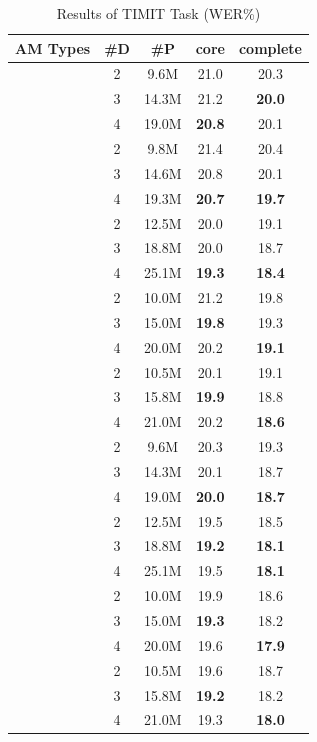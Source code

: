 \documentclass[a4paper]{article}
\begin{document}
\begin{table}
\caption{Results of TIMIT Task (WER\%)}
\centering
\begin{tabular}{c|c|c|c|c}
\hline%
\textbf{AM Types} & \textbf{\#D} & \textbf{\#P} & \textbf{core} & \textbf{complete} \\ \hline\hline
\multirow{3}{2.4cm}{\centering{LSTM}} & 2 & 9.6M& 21.0&20.3 \\ %
& 3 & 14.3M&21.2 &\textbf{20.0} \\ %
& 4 & 19.0M&\textbf{20.8} &20.1 \\ \hline
\multirow{3}{2.4cm}{\centering{Residual LSTM \cite{residual-lstm}}} & 2 &9.8M &21.4 &20.4 \\
& 3 &14.6M &20.8 &20.1 \\ %
& 4 &19.3M &\textbf{20.7} &\textbf{19.7} \\ \hline
\multirow{3}{2.4cm}{\centering{LSTM Res-1}} & 2 &12.5M &20.0 &19.1 \\ %
& 3 & 18.8M& 20.0&18.7 \\ %
& 4 & 25.1M& \textbf{19.3}&\textbf{18.4} \\ \hline
\multirow{3}{2.4cm}{\centering{LSTM Res-2}} & 2 &10.0M &21.2 &19.8 \\ %
& 3 &15.0M &\textbf{19.8} &19.3 \\ %
& 4 &20.0M &20.2 &\textbf{19.1} \\ \hline
\multirow{3}{2.4cm}{\centering{LSTM Res-3}} & 2 &10.5M &20.1 &19.1 \\ %
& 3 &15.8M &\textbf{19.9} &18.8 \\ %
& 4 &21.0M &20.2 &\textbf{18.6} \\ \hline
\multirow{3}{2.4cm}{\centering{Fast LSTM}} & 2 &9.6M &20.3 &19.3 \\ %
& 3 &14.3M &20.1 &18.7 \\ %
& 4 &19.0M &\textbf{20.0} &\textbf{18.7} \\ \hline
\multirow{3}{2.4cm}{\centering{Fast LSTM Res-1}} & 2 & 12.5M&19.5 &18.5 \\ %
& 3 &18.8M &\textbf{19.2} &\textbf{18.1} \\ %
& 4 &25.1M &19.5 &\textbf{18.1} \\ \hline
\multirow{3}{2.4cm}{\centering{Fast LSTM Res-2}} & 2 &10.0M &19.9 &18.6 \\ %
& 3 &15.0M &\textbf{19.3} &18.2 \\ %
& 4 &20.0M &19.6 &\textbf{17.9} \\ \hline
\multirow{3}{2.4cm}{\centering{Fast LSTM Res-3}} & 2 &10.5M &19.6 &18.7 \\ %
& 3 &15.8M &\textbf{19.2} &18.2 \\ %
& 4 &21.0M &19.3 &\textbf{18.0} \\ \hline
\end{tabular}
\end{table}
\end{document}
